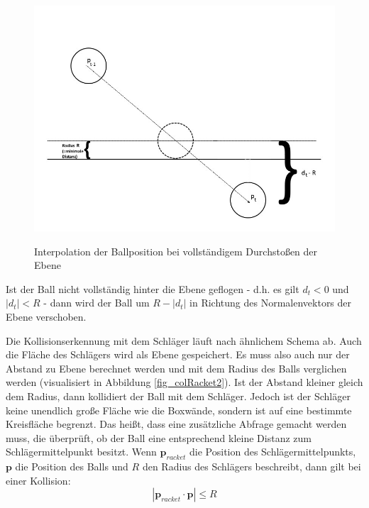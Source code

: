 \begin{figure}[h]
   \begin{center}
       \includegraphics[scale=0.5]{bilder/interpolation}\label{fig_interpolation}
   \end{center}
    
    \caption{Interpolation der Ballposition bei vollständigem Durchstoßen der Ebene}
        \label{fig_interpol}
\end{figure} 

Ist der Ball nicht vollständig hinter die Ebene geflogen - d.h. es gilt $d_t<0$ und $|d_t|<R $ - dann wird der Ball um $R - |d_t|$ in Richtung des Normalenvektors der Ebene verschoben.

Die Kollisionserkennung mit dem Schläger läuft nach ähnlichem Schema ab. Auch die Fläche des Schlägers wird als Ebene gespeichert. Es muss also auch nur der Abstand zu Ebene berechnet werden und mit dem Radius des Balls verglichen werden (visualisiert in Abbildung \ref{fig_colRacket2}). Ist der Abstand kleiner gleich dem Radius, dann kollidiert der Ball mit dem Schläger. Jedoch ist der Schläger keine unendlich große Fläche wie die  Boxwände, sondern ist auf eine bestimmte Kreisfläche begrenzt. Das heißt, dass eine zusätzliche Abfrage gemacht werden muss, die überprüft, ob der Ball eine entsprechend kleine Distanz zum Schlägermittelpunkt besitzt.
Wenn $\mathbf{p}_{racket}$ die Position des Schlägermittelpunkts, $\mathbf{p}$ die Position des Balls und $R$ den Radius des Schlägers beschreibt, dann gilt bei einer Kollision:
\begin{equation}
	|\mathbf{p}_{racket}\cdot\mathbf{p}| \leq R
\end{equation}

